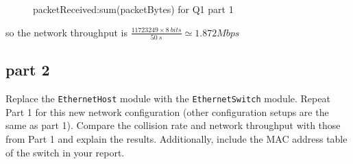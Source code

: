 \begin{qsolve}
\begin{qsolve}[]
\begin{figure}[H]
            \caption{packetReceived:sum(packetBytes) for Q1 part 1}
        \end{figure}
        so the network throughput is $\frac{11723249\times 8\ bits}{50\ s} \simeq 1.872 Mbps$
    \end{qsolve}
\end{qsolve}
\subsection{part 2}
Replace the \texttt{EthernetHost} module with the \texttt{EthernetSwitch} module. Repeat Part 1 for this new network configuration (other configuration setups are the same as part 1). Compare the collision rate and network throughput with those from Part 1 and explain the results. Additionally, include the MAC address table of the switch in your report.
